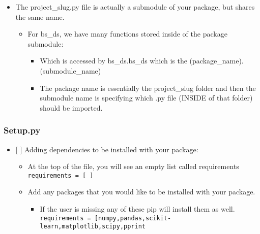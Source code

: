 \documentclass[11pt]{article}
\providecommand{\tightlist}{%
      \setlength{\itemsep}{0pt}\setlength{\parskip}{0pt}}
\begin{document}
\begin{itemize}
\begin{itemize}
\begin{itemize}
      \begin{itemize}
      \tightlist
      \item
        The project\_slug.py file is actually a submodule of your
        package, but shares the same name.

        \begin{itemize}
        \tightlist
        \item
          For bs\_ds, we have many functions stored inside of the
          package submodule:

          \begin{itemize}
          \tightlist
          \item
            Which is accessed by bs\_ds.bs\_ds which is the
            (package\_name).(submodule\_name)
          \item
            The package name is essentially the project\_slug folder and
            then the submodule name is specifying which .py file (INSIDE
            of that folder) should be imported.
          \end{itemize}
        \end{itemize}
      \end{itemize}
    \end{itemize}
  \end{itemize}
\end{itemize}

\hypertarget{setup.py}{%
\subsubsection{Setup.py}\label{setup.py}}

\begin{itemize}
\tightlist
\item
  {[} {]} Adding dependencies to be installed with your package:

  \begin{itemize}
  \tightlist
  \item
    At the top of the file, you will see an empty list called
    requirements \texttt{requirements\ =\ {[}\ {]}}
  \item
    Add any packages that you would like to be installed with your
    package.

    \begin{itemize}
    \tightlist
    \item
      If the user is missing any of these pip will install them as well.
      \texttt{requirements\ =\ {[}\textquotesingle{}numpy\textquotesingle{},\textquotesingle{}pandas\textquotesingle{},\textquotesingle{}scikit-learn\textquotesingle{},\textquotesingle{}matplotlib\textquotesingle{},\textquotesingle{}scipy\textquotesingle{},\textquotesingle{}pprint\textquotesingle{}{]}}
    \end{itemize}
  \end{itemize}
\end{itemize}
\end{document}
